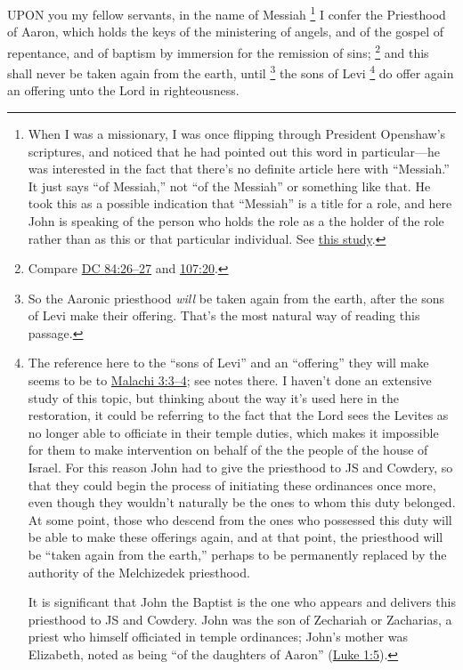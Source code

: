 		UPON you my fellow servants, in the name of Messiah%
			\footnote{%
				When I was a missionary, I was once flipping through President Openshaw's scriptures, and noticed that he had pointed out this word in particular---he was interested in the fact that there's no definite article here with ``Messiah.'' It just says ``of Messiah,'' not ``of the Messiah'' or something like that. He took this as a possible indication that ``Messiah'' is a title for a role, and here John is speaking of the person who holds the role as a the holder of the role rather than as this or that particular individual. See \hyperref[CHRIST-role]{this study}.
				}
		I confer the Priesthood of Aaron, which holds the keys of the ministering of angels, and of the gospel of repentance, and of baptism by immersion for the remission of sins;%
			\footnote{%
				Compare \hyperref[DC84-26]{DC 84:26--27} and \hyperref[DC107-20]{107:20}.
				}
		and this shall never be taken again from the earth, until%
			\footnote{%
				So the Aaronic priesthood \textit{will} be taken again from the earth, after the sons of Levi make their offering. That's the most natural way of reading this passage.
				}
		the sons of Levi%
			\footnote{%
				The reference here to the ``sons of Levi'' and an ``offering'' they will make seems to be to \hyperref[MALACHI-3-3]{Malachi 3:3--4}; see notes there. I haven't done an extensive study of this topic, but thinking about the way it's used here in the restoration, it could be referring to the fact that the Lord sees the Levites as no longer able to officiate in their temple duties, which makes it impossible for them to make intervention on behalf of the the people of the house of Israel. For this reason John had to give the priesthood to JS and Cowdery, so that they could begin the process of initiating these ordinances once more, even though they wouldn't naturally be the ones to whom this duty belonged. At some point, those who descend from the ones who possessed this duty will be able to make these offerings again, and at that point, the priesthood will be ``taken again from the earth,'' perhaps to be permanently replaced by the authority of the Melchizedek priesthood.
				
				It is significant that John the Baptist is the one who appears and delivers this priesthood to JS and Cowdery. John was the son of Zechariah or Zacharias, a priest who himself officiated in temple ordinances; John's mother was Elizabeth, noted as being ``of the daughters of Aaron'' (\hyperref[LUKE-1-5]{Luke 1:5}).
				}
		do offer again an offering unto the Lord in righteousness.

